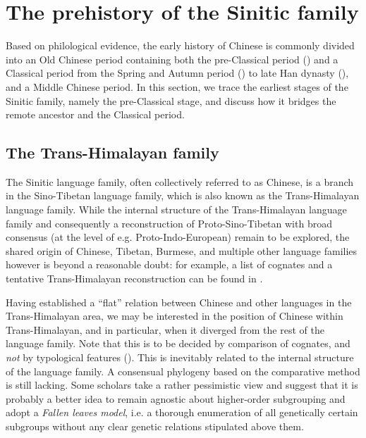 \documentclass[UTF8, a4paper, oneside, scheme=plain, 12pt]{ctexrep}
\begin{document}
\section{The prehistory of the Sinitic family}\label{sec:introduction.history}

Based on philological evidence, the early history of Chinese is commonly divided into 
an Old Chinese period containing both the pre-Classical period ()
and a Classical period from the Spring and Autumn period ()
to late Han dynasty (), and a Middle Chinese period.
In this section, we trace the earliest stages of the Sinitic family,
namely the pre-Classical stage, and discuss how it bridges the remote ancestor
and the Classical period.

\subsection{The Trans-Himalayan family}

The Sinitic language family, often collectively referred to as Chinese,
is a branch in the Sino-Tibetan language family, which is also known as the Trans-Himalayan language family.
While the internal structure of the Trans-Himalayan language family
and consequently a reconstruction of Proto-Sino-Tibetan with broad consensus
(at the level of e.g. Proto-Indo-European) remain to be explored,
the shared origin of Chinese, Tibetan, Burmese, and multiple other language families
however is beyond a reasonable doubt:
for example, a list of cognates and a tentative Trans-Himalayan reconstruction can be found in \citet{hill2019historical}.

Having established a ``flat'' relation between Chinese and other languages in the Trans-Himalayan area, 
we may be interested in the position of Chinese within Trans-Himalayan,
and in particular, when it diverged from the rest of the language family.
Note that this is to be decided by comparison of cognates,
and \emph{not} by typological features ().
This is inevitably related to the internal structure of the language family.
A consensual phylogeny based on the comparative method is still lacking.
Some scholars take a rather pessimistic view and suggest that
it is probably a better idea to remain agnostic about higher-order subgrouping
and adopt a \emph{Fallen leaves model}, i.e. a thorough enumeration of all genetically certain subgroups without any clear genetic relations stipulated above them.
\end{document}

